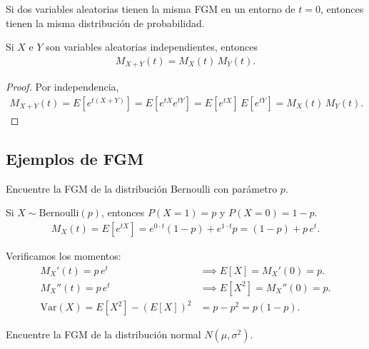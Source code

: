 \begin{teorema}[Unicidad]
Si dos variables aleatorias tienen la misma FGM en un entorno de $t=0$, entonces tienen
la misma distribución de probabilidad.
\end{teorema}

\begin{teorema}
Si $X$ e $Y$ son variables aleatorias independientes, entonces
\begin{align}
 \label{eq:2.8.13}
 M_{X+Y}(t) = M_X(t)\,M_Y(t).
\end{align}
\end{teorema}

\begin{proof}
Por independencia,
\begin{align}
 M_{X+Y}(t) = E[e^{t(X+Y)}] = E[e^{tX}e^{tY}] = E[e^{tX}]\,E[e^{tY}] = M_X(t)\,M_Y(t).
\end{align}
\end{proof}

\subsection{Ejemplos de FGM}

\begin{ejemplo}
 \label{exmp:2.8.4}
Encuentre la FGM de la distribución Bernoulli con parámetro $p$.
\end{ejemplo}

\begin{solucion}
Si $X \sim \text{Bernoulli}(p)$, entonces $P(X=1) = p$ y $P(X=0) = 1-p$.
\begin{align}
 M_X(t) = E[e^{tX}] = e^{0 \cdot t}(1-p) + e^{1 \cdot t}p
 = (1-p) + p\,e^t.
\end{align}

Verificamos los momentos:
\begin{align}
 M_X'(t) = p\,e^t &\implies E[X] = M_X'(0) = p. \\
 M_X''(t) = p\,e^t &\implies E[X^2] = M_X''(0) = p. \\
 \text{Var}(X) = E[X^2] - (E[X])^2 &= p - p^2 = p(1-p).
\end{align}
\end{solucion}

\begin{ejemplo}
 \label{exmp:2.8.5}
Encuentre la FGM de la distribución normal $N(\mu, \sigma^2)$.
\end{ejemplo}


